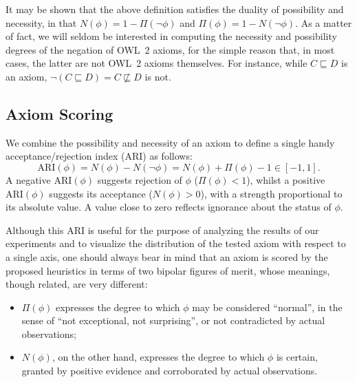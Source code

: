 \documentclass{sig-alternate}
\begin{document}
It may be shown that the above definition satisfies the duality of
possibility and necessity, in that $N(\phi) = 1 - \Pi(\neg\phi)$ and
$\Pi(\phi) = 1 - N(\neg\phi)$.
As a matter of fact, we will seldom be interested in computing the necessity and
possibility degrees of the negation of OWL~2 axioms, for the simple reason that, in most cases,
the latter are not OWL~2 axioms themselves. For instance, while $C \sqsubseteq D$
is an axiom, $\neg(C \sqsubseteq D) = C \not\sqsubseteq D$ is not.



\subsection{Axiom Scoring}
We combine the possibility and necessity of an axiom to define
a single handy acceptance/rejection index (ARI) as follows:
\begin{equation}\label{eq:ARI}
  \mathrm{ARI}(\phi) = N(\phi) - N(\neg\phi) = N(\phi) + \Pi(\phi) - 1 \in [-1, 1].
\end{equation}
A negative $\mathrm{ARI}(\phi)$ suggests rejection of $\phi$ ($\Pi(\phi)<1$),
whilst a positive $\mathrm{ARI}(\phi)$ suggests its acceptance ($N(\phi)>0$),
with a strength proportional to its absolute value. A value close to zero
reflects ignorance about the status of $\phi$.

Although this ARI is useful for the purpose of analyzing the results of our
experiments and to visualize the distribution of the tested axiom with respect
to a single axis, one should always bear in mind that an axiom is scored by
the proposed heuristics in terms of two bipolar figures of merit,
whose meanings, though related, are very different:
\begin{itemize}
\item $\Pi(\phi)$ expresses the degree to which $\phi$ may be considered ``normal'',
  in the sense of ``not exceptional, not surprising'', or not contradicted by
  actual observations;
\item $N(\phi)$, on the other hand, expresses the degree to which $\phi$ is
  certain, granted by positive evidence and corroborated by actual observations.
\end{itemize}
\end{document}
